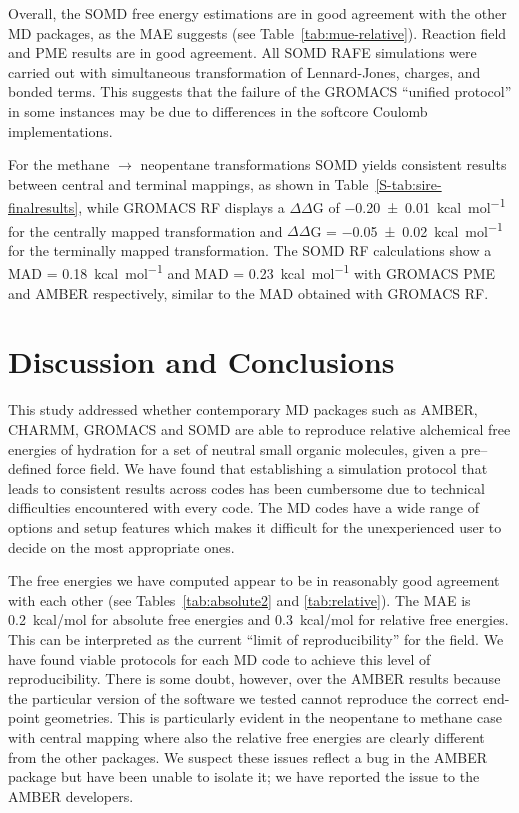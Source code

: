 \documentclass[journal=jctcce,manuscript=article]{achemso}
\begin{document}
Overall, the SOMD free energy estimations are in good agreement with the 
other MD packages, as the MAE suggests (see Table~\ref{tab:mue-relative}). 
Reaction field and PME 
results are in good agreement.  All SOMD RAFE simulations were carried out with simultaneous transformation of Lennard-Jones, charges, and bonded terms. This suggests that the failure of the GROMACS ``unified protocol'' in some instances may be due to differences in the softcore Coulomb implementations. 

For the methane $\rightarrow$ neopentane transformations SOMD yields consistent results between central and terminal mappings, as shown in 
Table~\ref{S-tab:sire-finalresults}, while GROMACS RF displays a $\Delta\Delta$G 
of \SI{-0.20 +-   0.01}{kcal.mol^{-1}} for the centrally mapped transformation 
and $\Delta\Delta$G = \SI{-0.05 +- 0.02}{kcal.mol^{-1}} for the terminally 
mapped transformation. The SOMD RF calculations show a MAD = 
\SI{0.18}{kcal.mol^{-1}} and MAD = \SI{0.23}{kcal.mol^{-1}} with GROMACS PME 
and AMBER respectively, similar to the MAD obtained with GROMACS RF.



\section{Discussion and Conclusions}
\label{sec:discuss}

This study addressed whether contemporary MD packages such as AMBER, CHARMM, GROMACS and SOMD are able to reproduce relative alchemical free energies of hydration for a set of neutral small organic molecules, given a 
pre--defined force field.  
We have found that establishing a simulation protocol that leads to consistent results across codes has been cumbersome due to technical difficulties encountered with every code.  The MD codes have a wide range of options and setup features which makes it difficult for the unexperienced user to decide on the most 
appropriate ones.

The free energies we have computed appear to be in reasonably good agreement with each other (see Tables~\ref{tab:absolute2} and \ref{tab:relative}).  The MAE is \SI{0.2}{kcal/mol} for absolute free energies and \SI{0.3}{kcal/mol} for 
relative free energies.  This can be interpreted as the current ``limit of reproducibility'' for the field.  We have found viable protocols for each MD code to achieve 
this level of reproducibility.  There is some doubt, however, over the AMBER 
results because the particular version of the software we tested  cannot reproduce the correct end-point 
geometries.  This is particularly evident in the neopentane to methane case 
with central mapping where also the relative free energies are clearly 
different from the other packages.  We suspect these issues reflect a bug in 
the AMBER package but have been unable to isolate it; we have reported the 
issue to the AMBER developers.
\end{document}
